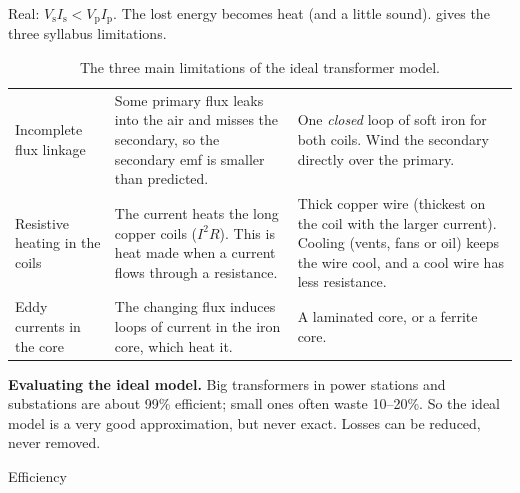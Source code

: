 Real: $V_\mathrm{s}I_\mathrm{s} < V_\mathrm{p}I_\mathrm{p}$. The lost energy becomes heat
(and a little sound).  gives the three syllabus limitations.

\begin{table}
  \caption{The three main limitations of the ideal transformer model.}\label{ch4:tab:losses}
  \centering\small
  \begin{tabular}{@{}L{25mm}L{64mm}L{48mm}@{}}
    \toprule
     &  & \\
    \midrule
    Incomplete flux linkage & Some primary flux leaks into the air and misses the
      secondary, so the secondary emf is smaller than predicted. &
      One \emph{closed} loop of soft iron for both coils. Wind the secondary directly over
      the primary.\\
    \addlinespace
    Resistive heating in the coils & The current heats the long copper coils ($I^2R$).
      This  is heat made when a current flows through a
      resistance. &
      Thick copper wire (thickest on the coil with the larger current). Cooling (vents,
      fans or oil) keeps the wire cool, and a cool wire has less resistance.\\
    \addlinespace
    Eddy currents in the core & The changing flux induces loops of current in the iron
      core, which heat it. & A laminated core, or a ferrite core.\\
    \bottomrule
  \end{tabular}
\end{table}

\textbf{Evaluating the ideal model.} Big transformers in power stations and
substations are about 99\% efficient; small ones often waste 10--20\%. So the ideal model
is a very good approximation, but never exact. Losses can be reduced, never removed.

\begin{formulacard}[notonsheet]{Efficiency}
  \begin{symbols}
  \end{symbols}
\end{formulacard}

